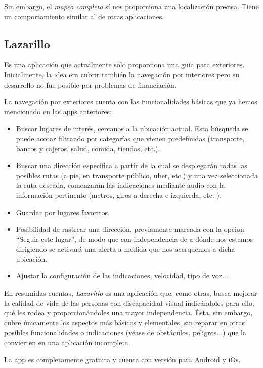 Sin embargo, el \textit{mapeo completo} sí nos proporciona una localización precisa. Tiene un comportamiento similar al de otras aplicaciones.

\subsection{Lazarillo}
Es una aplicación que actualmente solo proporciona una guía para exteriores. Inicialmente, la idea era cubrir también la navegación por interiores pero su desarrollo no fue posible por problemas de financiación.

La navegación por exteriores cuenta con las funcionalidades básicas que ya hemos mencionado en las apps anteriores: \begin{itemize}
	\item Buscar lugares de interés, cercanos a la ubicación actual. Esta búsqueda se puede acotar filtrando por categorías que vienen predefinidas (transporte, bancos y cajeros, salud, comida, tiendas, etc.).
	\item Buscar una dirección específica a partir de la cual se desplegarán todas las posibles rutas (a pie, en transporte público, uber, etc.) y una vez seleccionada la ruta deseada, comenzarán las indicaciones mediante audio con la información pertinente (metros, giros a derecha e izquierda, etc. ). 
	\item Guardar por lugares favoritos.
	\item Posibilidad de rastrear una dirección, previamente marcada con la opcion ``Seguir este lugar'', de modo que con independencia de a dónde nos estemos dirigiendo se activará una alerta a medida que nos acerquemos a dicha ubicación.
	\item Ajustar la configuración de las indicaciones, velocidad, tipo de voz...
\end{itemize}

En resumidas cuentas, \textit{Lazarillo} es una aplicación que, como otras, busca mejorar la calidad de vida de las personas con discapacidad visual indicándoles para ello, qué les rodea y proporcionándoles una mayor independencia. Ésta, sin embargo, cubre únicamente los aspectos más básicos y elementales, sin reparar en otras posibles funcionalidades o indicaciones (véase de obstáculos, peligros...) que la convierten en una aplicación incompleta.

La app es completamente gratuita y cuenta con versión para Android y iOs.
